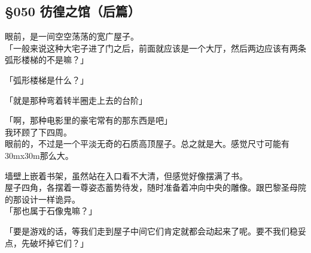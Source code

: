\subsection{§050 彷徨之馆（后篇）}

眼前，是一间空空荡荡的宽广屋子。\\

「一般来说这种大宅子进了门之后，前面就应该是一个大厅，然后两边应该有两条弧形楼梯的不是嘛？」

「弧形楼梯是什么？」

「就是那种弯着转半圈走上去的台阶」

「啊，那种电影里的豪宅常有的那东西是吧」\\

我环顾了下四周。\\

眼前的，不过是一个平淡无奇的石质高顶屋子。总之就是大。感觉尺寸可能有30mx30m那么大。

墙壁上嵌着书架，虽然站在入口看不大清，但感觉好像摆满了书。\\

屋子四角，各摆着一尊姿态蓄势待发，随时准备着冲向中央的雕像。跟巴黎圣母院的那设计一样诡异。\\

「那也属于石像鬼嘛？」

「要是游戏的话，等我们走到屋子中间它们肯定就都会动起来了呢。要不我们稳妥点，先破坏掉它们？」

